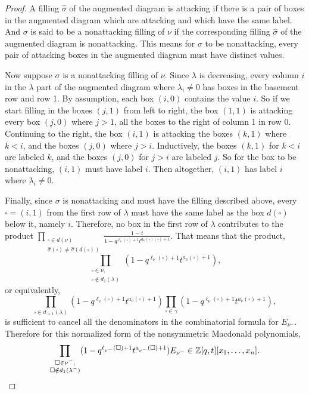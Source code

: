 \documentclass[ALCO]{cedram}
\newcommand{\numin}{{\nu^-}}
\newcommand{\legnu}{{\ell_\nu(\square)}}
\newcommand{\legnumin}{{\ell_{\nu^-}(\square)}}
\newcommand{\armtwonu}{{a_\nu(\square)}}
\newcommand{\armtwonumin}{{a_{\nu^-}(\square)}}
\newcommand{\nonsymmetricprod}{\prod\limits_{\square \in \gamma}}
\newcommand{\dg}{d}
\begin{document}
\begin{proof}
A filling $\widehat{\sigma}$ of the augmented diagram is attacking if there is a pair of boxes in the augmented diagram which are attacking and which have the same label. And $\sigma$ is said to be a nonattacking filling of $\nu$ if the corresponding filling $\widehat{\sigma}$ of the augmented diagram is nonattacking. This means for $\sigma$ to be nonattacking, every pair of attacking boxes in the augmented diagram must have distinct values.

Now suppose $\sigma$ is a nonattacking filling of $\nu$. Since $\lambda$ is decreasing, every column $i$ in the $\lambda$ part of the augmented diagram where $\lambda_i \neq 0$ has boxes in the basement row and row 1. By assumption, each box $(i,0)$ contains the value $i$. So if we start filling in the boxes $(j,1)$ from left to right, the box $(1,1)$ is attacking every box $(j,0)$ where $j>1$, all the boxes to the right of column 1 in row 0. Continuing to the right, the box $(i,1)$ is attacking the boxes $(k,1)$ where $k<i$, and the boxes $(j,0)$ where $j>i$. Inductively, the boxes $(k,1)$ for $k<i$ are labeled $k$, and the boxes $(j,0)$ for $j>i$ are labeled $j$. So for the box to be nonattacking, $(i,1)$ must have label $i$. Then altogether, $(i,1)$ has label $i$ where $\lambda_i \neq 0$.

Finally, since $\sigma$ is nonattacking and must have the filling described above, every $\square = (i,1)$ 
from the first row of $\lambda$ must have the same label as the box $d(\square)$ below it, namely $i$.
Therefore, no box in the first row of $\lambda$ contributes to the product $\displaystyle{\prod\limits_{\substack{\square \in  \dg(\nu) \\ \widehat{\sigma}(\square) \neq \widehat{\sigma}(d(\square))}}} \frac{1-t}{1-q^{\legnu+1} t^{\armtwonu(\square)+1}}$. That means that the product, \[ \prod\limits_{\substack{\square \in \nu, \\ \square \notin d_1(\lambda) }}(1-q^{\legnu+1}t^{\armtwonu + 1}),\] or equivalently, \[\prod\limits_{\square \in d_{>1}(\lambda) }(1-q^{\legnu+1}t^{\armtwonu + 1}) \nonsymmetricprod(1-q^{\legnu+1}t^{\armtwonu + 1}),\] is sufficient to cancel all the denominators in the combinatorial formula for $E_\numin$. Therefore for this normalized form of the nonsymmetric Macdonald polynomials, \[\prod\limits_{\substack{\square \in \numin, \\ \square \notin d_1(\lambda^-) }}(1-q^{\legnumin+1}t^{\armtwonumin + 1}) E_\numin \in \mathbb{Z}[q,t][x_1,\dotsc,x_n].\qedhere\]
\end{proof}
\end{document}
